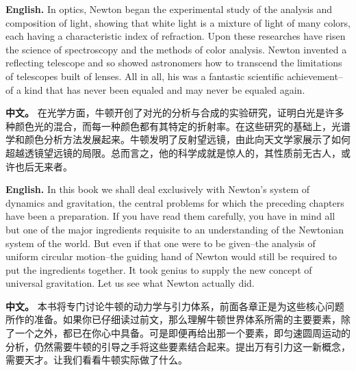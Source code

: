\noindent\textbf{English.} In optics, Newton began the experimental study of the analysis and composition of light, showing that white light is a mixture of light of many colors, each having a characteristic index of refraction. Upon these researches have risen the science of spectroscopy and the methods of color analysis. Newton invented a reflecting telescope and so showed astronomers how to transcend the limitations of telescopes built of lenses. All in all, his was a fantastic scientific achievement--of a kind that has never been equaled and may never be equaled again.
\par\noindent\textbf{中文。} 在光学方面，牛顿开创了对光的分析与合成的实验研究，证明白光是许多种颜色光的混合，而每一种颜色都有其特定的折射率。在这些研究的基础上，光谱学和颜色分析方法发展起来。牛顿发明了反射望远镜，由此向天文学家展示了如何超越透镜望远镜的局限。总而言之，他的科学成就是惊人的，其性质前无古人，或许也后无来者。
\medskip

\noindent\textbf{English.} In this book we shall deal exclusively with Newton's system of dynamics and gravitation, the central problems for which the preceding chapters have been a preparation. If you have read them carefully, you have in mind all but one of the major ingredients requisite to an understanding of the Newtonian system of the world. But even if that one were to be given--the analysis of uniform circular motion--the guiding hand of Newton would still be required to put the ingredients together. It took genius to supply the new concept of universal gravitation. Let us see what Newton actually did.
\par\noindent\textbf{中文。} 本书将专门讨论牛顿的动力学与引力体系，前面各章正是为这些核心问题所作的准备。如果你已仔细读过前文，那么理解牛顿世界体系所需的主要要素，除了一个之外，都已在你心中具备。可是即便再给出那一个要素，即匀速圆周运动的分析，仍然需要牛顿的引导之手将这些要素结合起来。提出万有引力这一新概念，需要天才。让我们看看牛顿实际做了什么。
\medskip

